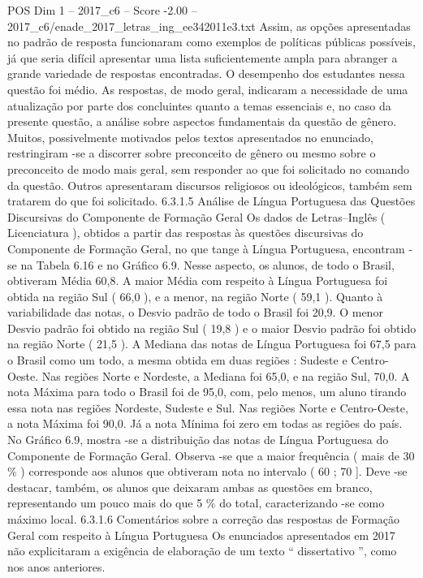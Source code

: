 \begin{textsample}{POS Dim 1 – 2017\_c6 – Score -2.00 – 2017\_c6/enade\_2017\_letras\_ing\_ee342011e3.txt}
Assim, as opções apresentadas no padrão de resposta funcionaram como exemplos de políticas públicas possíveis, já que seria difícil apresentar uma lista suficientemente ampla para abranger a grande variedade de respostas encontradas.
O desempenho dos estudantes nessa questão foi médio.
As respostas, de modo geral, indicaram a necessidade de uma atualização por parte dos concluintes quanto a temas essenciais e, no caso da presente questão, a análise sobre aspectos fundamentais da questão de gênero.
Muitos, possivelmente motivados pelos textos apresentados no enunciado, restringiram -se a discorrer sobre preconceito de gênero ou mesmo sobre o preconceito de modo mais geral, sem responder ao que foi solicitado no comando da questão.
Outros apresentaram discursos religiosos ou ideológicos, também sem tratarem do que foi solicitado. 6.3.1.5 Análise de Língua Portuguesa das Questões Discursivas do Componente de Formação Geral Os dados de Letras–Inglês ( Licenciatura ), obtidos a partir das respostas às questões discursivas do Componente de Formação Geral, no que tange à Língua Portuguesa, encontram -se na Tabela 6.16 e no Gráfico 6.9.
Nesse aspecto, os alunos, de todo o Brasil, obtiveram Média 60,8.
A maior Média com respeito à Língua Portuguesa foi obtida na região Sul ( 66,0 ), e a menor, na região Norte ( 59,1 ).
Quanto à variabilidade das notas, o Desvio padrão de todo o Brasil foi 20,9.
O menor Desvio padrão foi obtido na região Sul ( 19,8 ) e o maior Desvio padrão foi obtido na região Norte ( 21,5 ).
A Mediana das notas de Língua Portuguesa foi 67,5 para o Brasil como um todo, a mesma obtida em duas regiões : Sudeste e Centro-Oeste.
Nas regiões Norte e Nordeste, a Mediana foi 65,0, e na região Sul, 70,0.
A nota Máxima para todo o Brasil foi de 95,0, com, pelo menos, um aluno tirando essa nota nas regiões Nordeste, Sudeste e Sul.
Nas regiões Norte e Centro-Oeste, a nota Máxima foi 90,0.
Já a nota Mínima foi zero em todas as regiões do país.
No Gráfico 6.9, mostra -se a distribuição das notas de Língua Portuguesa do Componente de Formação Geral.
Observa -se que a maior frequência ( mais de 30 \% ) corresponde aos alunos que obtiveram nota no intervalo ( 60 ; 70 ].
Deve -se destacar, também, os alunos que deixaram ambas as questões em branco, representando um pouco mais do que 5 \% do total, caracterizando -se como máximo local. 6.3.1.6 Comentários sobre a correção das respostas de Formação Geral com respeito à Língua Portuguesa Os enunciados apresentados em 2017 não explicitaram a exigência de elaboração de um texto “ dissertativo ”, como nos anos anteriores.

\end{textsample}
